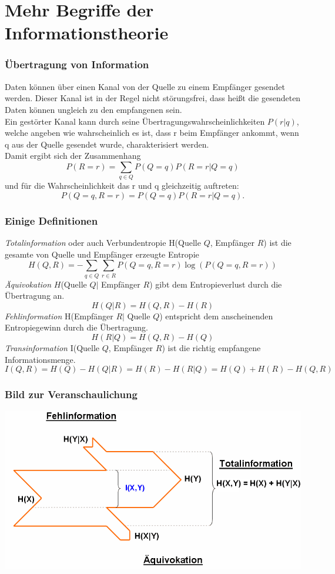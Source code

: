\section{Mehr Begriffe der Informationstheorie}
\begin{frame}
\frametitle{Übertragung von Information}
Daten können über einen Kanal von der Quelle zu einem Empfänger gesendet werden. Dieser Kanal ist in der Regel nicht störungsfrei, dass heißt die gesendeten Daten können ungleich zu den empfangenen sein.\\ 
Ein gestörter Kanal kann durch seine Übertragungswahrscheinlichkeiten $P(r|q)$, welche angeben wie wahrscheinlich es ist, dass r beim Empfänger ankommt, wenn q aus der Quelle gesendet wurde, charakterisiert werden.\\
Damit ergibt sich der Zusammenhang \[P(R=r)=\sum_{q \in Q} P(Q=q)P(R=r|Q=q)\] und für die Wahrscheinlichkeit das r und q gleichzeitig auftreten: \[P(Q=q,R=r)=P(Q=q)P(R=r|Q=q).\]
\end{frame}
\begin{frame}
\frametitle{Einige Definitionen}
\emph{Totalinformation} oder auch Verbundentropie H(Quelle $Q$, Empfänger $R$) ist die gesamte von Quelle und Empfänger erzeugte Entropie
\[H(Q,R)=-\sum_{q \in Q} \sum_{r \in R} P(Q=q,R=r)\log(P(Q=q,R=r))\]
\emph{Äquivokation} $H$(Quelle $Q|$ Empfänger $R$) gibt dem Entropieverlust durch die Übertragung an.\\
\[H(Q|R)=H(Q,R)-H(R)\]
\emph{Fehlinformation} H(Empfänger $R|$ Quelle $Q$) entspricht dem anscheinenden Entropiegewinn durch die Übertragung.
\[H(R|Q)=H(Q,R)-H(Q)\]
\emph{Transinformation} I(Quelle $Q$, Empfänger $R$) ist die richtig empfangene Informationsmenge.
\[I(Q,R)= H(Q)-H(Q|R)=H(R)-H(R|Q)=H(Q)+H(R)-H(Q,R)\]
\end{frame}
\begin{frame}
\frametitle{Bild zur Veranschaulichung}
\begin{center}
\includegraphics[scale=0.35]{images/Entropie_XY}
\end{center}
\end{frame}
